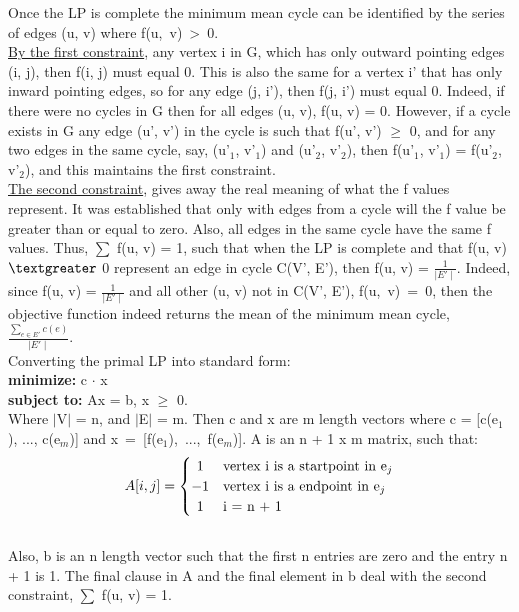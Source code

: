 \documentclass[10pt]{csc_assignment}
\begin{document}
\begin{description}
Once the LP is complete the minimum mean cycle can be identified by the series of edges (u, v) where \mbox{f(u, v) \textgreater ~0}. \\
\underline{By the first constraint}, any vertex i in G, which has only outward pointing edges (i, j), then f(i, j) must equal 0. This is also the same for a vertex i' that has only inward pointing edges, so for any edge (j, i'), then f(j, i') must equal 0. Indeed, if there were no cycles in G then for all edges (u, v), f(u, v) = 0. However, if a cycle exists in G any edge  (u', v') in the cycle is such that f(u', v') $\geqslant$ 0, and for any two edges in the same cycle, say, (u'$_{1}$, v'$_{1}$) and (u'$_{2}$, v'$_{2}$), then f(u'$_{1}$, v'$_{1}$) = f(u'$_{2}$, v'$_{2}$), and this maintains the first constraint.\\
\underline{The second constraint}, gives away the real meaning of what the f values represent. It was established that only with edges from a cycle will the f value be greater than or equal to zero. Also, all edges in the same cycle have the same f values. Thus, $\sum$ f(u, v) = 1, such that when the LP is complete and that f(u, v) $\textgreater$ 0 represent an edge in cycle C(V', E'), then f(u, v) = $\frac{1}{\mid E' \mid}$.
Indeed, since f(u, v) = $\frac{1}{\mid E' \mid}$ and all other (u, v) not in C(V', E'), \mbox{f(u, v) = 0}, then the objective function indeed returns the mean of the minimum mean cycle, $\frac{\sum_{e \in E'} c(e)}{\mid E' \mid}$.\\

Converting the primal LP into standard form:\\
\textbf{minimize:} c $\cdot$ x\\
\textbf{subject to:} Ax = b, x $\geqslant$ 0.\\
Where $\mid$V$\mid$ = n, and $\mid$E$\mid$ = m. Then c and x are m length vectors where c = [c(e$_{1}$), ..., c(e$_{m}$)] and \mbox{x = [f(e$_{1}$), ..., f(e$_{m}$)]}. A is an n + 1 x m matrix, such that:\\
\[
A[i, j] = 
\begin{cases} 
      \hfill 1 \hfill & \text{vertex i is a startpoint in e$_{j}$} \\
      \hfill -1 \hfill & \text{vertex i is a endpoint in e$_{j}$} \\
      \hfill 1 \hfill & \text{i = n + 1} \\
  \end{cases}
\]\\
Also, b is an n length vector such that the first n entries are zero and the entry n + 1 is 1. The final clause in A and the final element in b deal with the second constraint, $\sum$ f(u, v) = 1.\\


\end{description}
\end{document}
